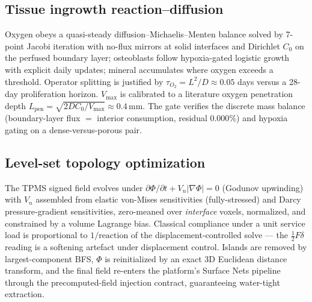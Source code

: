 \documentclass[5p,times,authoryear]{elsarticle}
\begin{document}
\subsection{Tissue ingrowth reaction--diffusion}
Oxygen obeys a quasi-steady diffusion--Michaelis--Menten balance solved by 7-point Jacobi iteration
with no-flux mirrors at solid interfaces and Dirichlet $C_0$ on the perfused boundary layer;
osteoblasts follow hypoxia-gated logistic growth with explicit daily updates; mineral accumulates
where oxygen exceeds a threshold. Operator splitting is justified by $\tau_{O_2}=L^2/D\approx0.05$
days versus a 28-day proliferation horizon. $V_{\max}$ is calibrated to a literature oxygen
penetration depth $L_{\mathrm{pen}}=\sqrt{2DC_0/V_{\max}}\approx0.4$\,mm. The gate verifies the
discrete mass balance (boundary-layer flux $=$ interior consumption, residual $0.000\%$) and
hypoxia gating on a dense-versus-porous pair.

\subsection{Level-set topology optimization}
The TPMS signed field evolves under $\partial\Phi/\partial t+V_n|\nabla\Phi|=0$ (Godunov upwinding)
with $V_n$ assembled from elastic von-Mises sensitivities (fully-stressed) and Darcy pressure-gradient
sensitivities, zero-meaned over \emph{interface} voxels, normalized, and constrained by a volume
Lagrange bias. Classical compliance under a unit service load is proportional to $1/\text{reaction}$
of the displacement-controlled solve --- the $\tfrac12 F\delta$ reading is a softening artefact under
displacement control. Islands are removed by largest-component BFS, $\Phi$ is reinitialized by an
exact 3D Euclidean distance transform, and the final field re-enters the platform's Surface Nets
pipeline through the precomputed-field injection contract, guaranteeing water-tight extraction.
\end{document}

